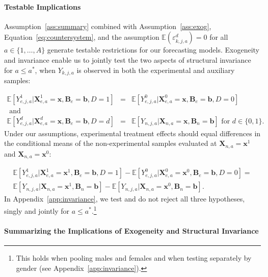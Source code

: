 \paragraph{Testable Implications}

\noindent Assumption~\ref{ass:summary} combined with Assumption~\ref{ass:exog}, Equation~\eqref{eq:countersystem}, and the assumption $\mathbb{E}(\varepsilon^d_{k,j,a})=0$ for all $a \in \{1,\dots,A\}$ generate testable restrictions for our forecasting models. Exogeneity and invariance enable us to jointly test the two aspects of structural invariance for $a \leq a^*$, when $Y_{k,j,a}$ is observed in both the experimental and auxiliary samples:

\begin{eqnarray}
\mathbb{E} \left[ Y_{e,j,a}^1 | \bm{X}_{e,a}^1 = \bm{x}, \bm{B}_{e} = \bm{b}, D = 1   \right] &=&  \mathbb{E} \left[ Y_{e,j,a}^0 | \bm{X}_{e,a}^0 = \bm{x}, \bm{B}_{e} = \bm{b}, D = 0   \right]  \\
\text{ and} & \nonumber \\
\mathbb{E} \left[ Y_{e,j,a}^d | \bm{X}_{e,a}^d = \bm{x}, \bm{B}_{e} = \bm{b}, D = d   \right] &=&  \mathbb{E} \left[ Y_{n,j,a} | \bm{X}_{n,a} = \bm{x}, \bm{B}_{n} = \bm{b} \right] \text{ for }  d \in \{0,1\}.
\end{eqnarray}
Under our assumptions, experimental treatment effects should equal differences in the conditional means of the non-experimental samples evaluated at $\bm{X}_{n,a} = \bm{x}^1$ and  $\bm{X}_{n,a} = \bm{x}^0$:

\begin{eqnarray}
\mathbb{E} \left[ Y_{e,j,a}^1 |  \bm{X}_{e,a}^1 = \bm{x}^1, \bm{B}_e = \bm{b}, D = 1 \right] - \mathbb{E} \left[ Y_{e,j,a}^0 |  \bm{X}_{e,a}^0 = \bm{x}^0, \bm{B}_e = \bm{b}, D = 0 \right] = \nonumber \\
\mathbb{E} \left[ Y_{n,j,a} | \bm{X}_{n,a} = \bm{x}^1, \bm{B}_n = \bm{b} \right] - \mathbb{E} \left[ Y_{n,j,a} | \bm{X}_{n,a} = \bm{x}^0, \bm{B}_n = \bm{b} \right].
\end{eqnarray}
In Appendix~\ref{app:invariance}, we test and do not reject all three hypotheses, singly and jointly for $a\leq a^*$.\footnote{This holds when pooling males and females and when testing separately by gender (see  Appendix~\ref{app:invariance}).}

\paragraph{Summarizing the Implications of Exogeneity and Structural Invariance}

